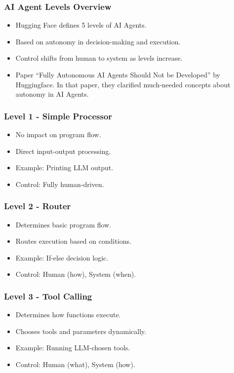 \begin{frame}[fragile]\frametitle{AI Agent Levels Overview}
      \begin{itemize}
      \item Hugging Face defines 5 levels of AI Agents.
      \item Based on autonomy in decision-making and execution.
      \item Control shifts from human to system as levels increase.
	  \item Paper ``Fully Autonomous AI Agents Should Not be Developed'' by Huggingface. In that paper, they clarified much-needed concepts about autonomy in AI Agents.
      \end{itemize}
\end{frame}

\begin{frame}[fragile]\frametitle{Level 1 - Simple Processor}
      \begin{itemize}
      \item No impact on program flow.
      \item Direct input-output processing.
      \item Example: Printing LLM output.
      \item Control: Fully human-driven.
      \end{itemize}
\end{frame}

\begin{frame}[fragile]\frametitle{Level 2 - Router}
      \begin{itemize}
      \item Determines basic program flow.
      \item Routes execution based on conditions.
      \item Example: If-else decision logic.
      \item Control: Human (how), System (when).
      \end{itemize}
\end{frame}

\begin{frame}[fragile]\frametitle{Level 3 - Tool Calling}
      \begin{itemize}
      \item Determines how functions execute.
      \item Chooses tools and parameters dynamically.
      \item Example: Running LLM-chosen tools.
      \item Control: Human (what), System (how).
      \end{itemize}
\end{frame}

